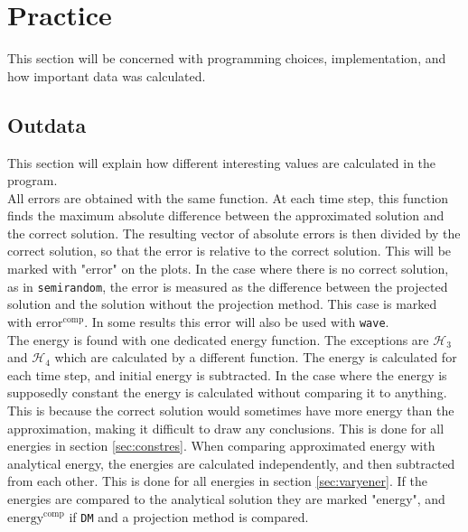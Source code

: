 \chapter{Practice}%
This section will be concerned with programming choices, implementation, and how important data was calculated.

\section{Outdata} %
This section will explain how different interesting values are calculated in the program. \\

All errors are obtained with the same function. At each time step, this function finds the maximum absolute difference between the approximated solution and the correct solution. The resulting vector of absolute errors is then divided by the correct solution, so that the error is relative to the correct solution. This will be marked with "error" on the plots. In the case where there is no correct solution, as in \texttt{semirandom}, the error is measured as the difference between the projected solution and the solution without the projection method. This case is marked with $\text{error}^{\text{comp}}$. In some results this error will also be used with \texttt{wave}.  \\

The energy is found with one dedicated energy function. The exceptions are $\mathcal{H}_3$ and $\mathcal{H}_4$ which are calculated by a different function. The energy is calculated for each time step, and initial energy is subtracted. In the case where the energy is supposedly constant the energy is calculated without comparing it to anything. This is because the correct solution would sometimes have more energy than the approximation, making it difficult to draw any conclusions. This is done for all energies in section \ref{sec:constres}. When comparing approximated energy with analytical energy, the energies are calculated independently, and then subtracted from each other. This is done for all energies in section \ref{sec:varyener}. If the energies are compared to the analytical solution they are marked "energy", and $\text{energy}^{\text{comp}}$ if \texttt{DM} and a projection method is compared. \\

